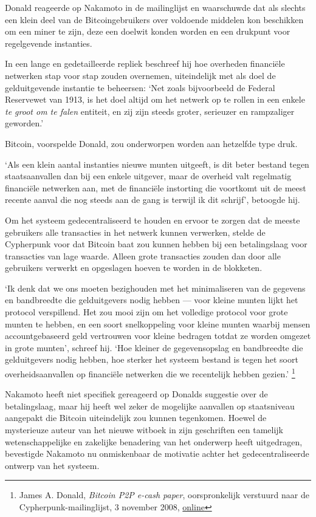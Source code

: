 \documentclass[
  a5paper,
  smalldemyvopaper,11pt,twoside,onecolumn,openright,extrafontsizes,
hidelinks]{memoir}
\begin{document}
Donald reageerde op Nakamoto in de mailinglijst en waarschuwde dat als
slechts een klein deel van de Bitcoingebruikers over voldoende middelen
kon beschikken om een miner te zijn, deze een doelwit konden worden en
een drukpunt voor regelgevende instanties.

In een lange en gedetailleerde repliek beschreef hij hoe overheden
financiële netwerken stap voor stap zouden overnemen, uiteindelijk met
als doel de gelduitgevende instantie te beheersen: `Net zoals
bijvoorbeeld de Federal Reservewet van 1913, is het doel altijd om het
netwerk op te rollen in een enkele \emph{te groot om te falen} entiteit,
en zij zijn steeds groter, serieuzer en rampzaliger geworden.'

Bitcoin, voorspelde Donald, zou onderworpen worden aan hetzelfde type
druk.

`Als een klein aantal instanties nieuwe munten uitgeeft, is dit beter
bestand tegen staatsaanvallen dan bij een enkele uitgever, maar de
overheid valt regelmatig financiële netwerken aan, met de financiële
instorting die voortkomt uit de meest recente aanval die nog steeds aan
de gang is terwijl ik dit schrijf', betoogde hij.

Om het systeem gedecentraliseerd te houden en ervoor te zorgen dat de
meeste gebruikers alle transacties in het netwerk kunnen verwerken,
stelde de Cypherpunk voor dat Bitcoin baat zou kunnen hebben bij een
betalingslaag voor transacties van lage waarde. Alleen grote transacties
zouden dan door alle gebruikers verwerkt en opgeslagen hoeven te worden
in de blokketen.

`Ik denk dat we ons moeten bezighouden met het minimaliseren van de
gegevens en bandbreedte die gelduitgevers nodig hebben --- voor kleine
munten lijkt het protocol verspillend. Het zou mooi zijn om het
volledige protocol voor grote munten te hebben, en een soort
snelkoppeling voor kleine munten waarbij mensen accountgebaseerd geld
vertrouwen voor kleine bedragen totdat ze worden omgezet in grote
munten', schreef hij. `Hoe kleiner de gegevensopslag en bandbreedte die
gelduitgevers nodig hebben, hoe sterker het systeem bestand is tegen het
soort overheidsaanvallen op financiële netwerken die we recentelijk
hebben gezien.' \footnote{James A. Donald, \emph{Bitcoin P2P e-cash
  paper}, oorspronkelijk verstuurd naar de Cypherpunk-mailinglijst, 3
  november 2008,
  \href{https://www.metzdowd.com/pipermail/cryptography/2008-November/014819.html}{online}}

Nakamoto heeft niet specifiek gereageerd op Donalds suggestie over de
betalingslaag, maar hij heeft wel zeker de mogelijke aanvallen op
staatsniveau aangepakt die Bitcoin uiteindelijk zou kunnen tegenkomen.
Hoewel de mysterieuze auteur van het nieuwe witboek in zijn geschriften
een tamelijk wetenschappelijke en zakelijke benadering van het onderwerp
heeft uitgedragen, bevestigde Nakamoto nu onmiskenbaar de motivatie
achter het gedecentraliseerde ontwerp van het systeem.
\end{document}

